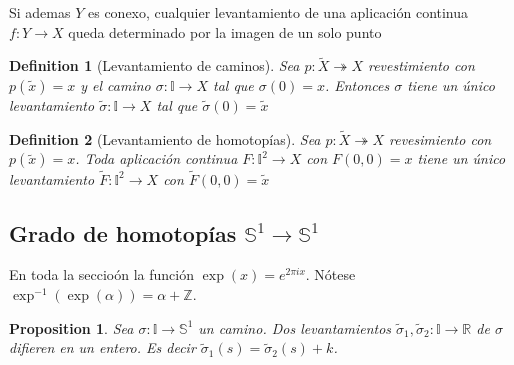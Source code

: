 \documentclass[leqno]{article}
\newtheorem*{definition}{Definition}
\newtheorem*{proposition}{Proposition}
\begin{document}
Si ademas $Y$ es conexo, cualquier levantamiento de una aplicación continua $f: Y \to X$ queda determinado por la imagen de un solo punto

\begin{minipage}{0.8\textwidth}
\begin{definition}[Levantamiento de caminos] Sea $p:\tilde{X} \twoheadrightarrow X$ revestimiento con $p(\tilde{x})=x$ y el camino $\sigma : \mathbb{I} \to X$ tal que $\sigma (0) = x$. Entonces $\sigma $ tiene un único levantamiento $\tilde{\sigma }: \mathbb{I} \to  X$ tal que  $\tilde{\sigma}(0) = \tilde{x}$
\end{definition}
\end{minipage}
\begin{minipage}{0.2\textwidth}
\end{minipage}

\begin{definition}[Levantamiento de homotopías] Sea $p:\tilde{X} \twoheadrightarrow X$ revesimiento con $p(\tilde{x})=x$. Toda aplicación continua $F:\mathbb{I}^2 \to X$ con $F(0, 0) = x$ tiene un único levantamiento  $\tilde{F}: \mathbb{I}^2 \to  X$ con $\tilde{F}(0, 0) = \tilde{x}$
\end{definition}

\subsection{Grado de homotopías $\mathbb{S}^1 \to \mathbb{S}^1$}
En toda la seccioón la función $\exp(x) = e^{2\pi i x}$. Nótese $\exp^{-1}(\exp(\alpha )) = \alpha + \mathbb{Z}$.

\begin{proposition}
Sea $\sigma : \mathbb{I} \to \mathbb{S}^1$ un camino. Dos levantamientos $\tilde{\sigma }_1, \tilde{\sigma }_2: \mathbb{I} \to  \mathbb{R}$ de $\sigma $ difieren en un entero. Es decir $\tilde{\sigma }_1(s) = \tilde{\sigma }_2(s) + k$.
\end{proposition}
\end{document}
